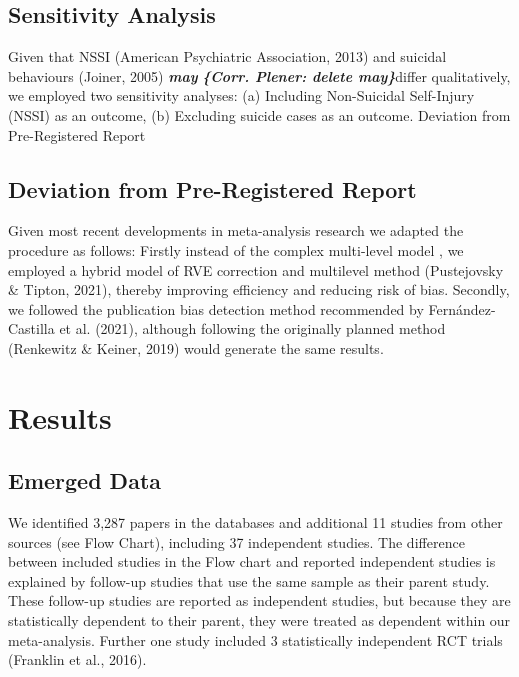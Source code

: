 \documentclass[
  english,
  man]{apa6}
\begin{document}
\hypertarget{sensitivity-analysis}{%
\subsection{Sensitivity Analysis}\label{sensitivity-analysis}}

Given that NSSI (American Psychiatric Association, 2013) and suicidal behaviours (Joiner, 2005) \textbf{\emph{may}} \textbf{\emph{\{Corr. Plener: delete may\}}}differ qualitatively, we employed two sensitivity analyses: (a) Including Non-Suicidal Self-Injury (NSSI) as an outcome, (b) Excluding suicide cases as an outcome. Deviation from Pre-Registered Report

\hypertarget{deviation-from-pre-registered-report}{%
\subsection{Deviation from Pre-Registered Report}\label{deviation-from-pre-registered-report}}

Given most recent developments in meta-analysis research we adapted the procedure as follows: Firstly instead of the complex multi-level model , we employed a hybrid model of RVE correction and multilevel method (Pustejovsky \& Tipton, 2021), thereby improving efficiency and reducing risk of bias. Secondly, we followed the publication bias detection method recommended by Fernández-Castilla et al. (2021), although following the originally planned method (Renkewitz \& Keiner, 2019) would generate the same results.

\hypertarget{results}{%
\section{Results}\label{results}}

\hypertarget{emerged-data}{%
\subsection{Emerged Data}\label{emerged-data}}

We identified 3,287 papers in the databases and additional 11 studies from other sources (see Flow Chart), including 37 independent studies. The difference between included studies in the Flow chart and reported independent studies is explained by follow-up studies that use the same sample as their parent study. These follow-up studies are reported as independent studies, but because they are statistically dependent to their parent, they were treated as dependent within our meta-analysis. Further one study included 3 statistically independent RCT trials (Franklin et al., 2016).
\end{document}
